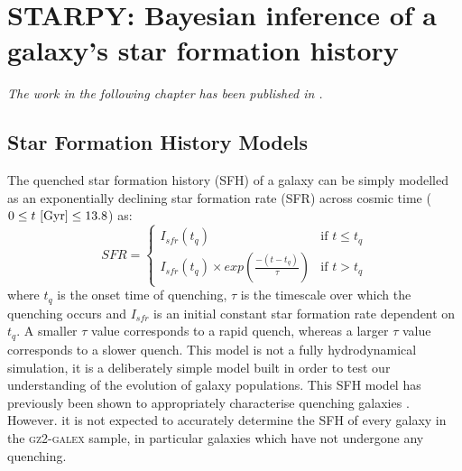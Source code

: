 \chapter{STARPY: Bayesian inference of a galaxy's star formation history}\label{chap:starpy}

\emph{The work in the following chapter has been published in \citet{smethurst15}.}
\\

\section{Star Formation History Models}\label{qmod}

The quenched star formation history (SFH) of a galaxy can be simply modelled as an exponentially declining star formation rate (SFR) across cosmic time ($0 \leq t ~\rm{[Gyr]} \leq 13.8$) as:
\begin{equation}\label{sfh}
SFR =
\begin{cases}
I_{sfr}(t_q) & \text{if } t \leq t_q \\
I_{sfr}(t_q) \times exp{\left( \frac{-(t-t_{q})}{\tau}\right)} & \text{if } t > t_q 
\end{cases}
\end{equation}
where $t_{q}$ is the onset time of quenching, $\tau$ is the timescale over which the quenching occurs and $I_{sfr}$ is an initial constant star formation rate dependent on $t_q$.  A smaller $\tau$ value corresponds to a rapid quench, whereas a larger $\tau$ value corresponds to a slower quench. This model is not a fully hydrodynamical simulation, it is a deliberately simple model built in order to test our understanding of the evolution of galaxy populations. This SFH model has previously been shown to appropriately characterise quenching galaxies \citep{weiner06, Martin07, noeske07,schawinski14}. However. it is not expected to accurately determine the SFH of every galaxy in the \textsc{gz2-galex} sample, in particular galaxies which have not undergone any quenching. 

